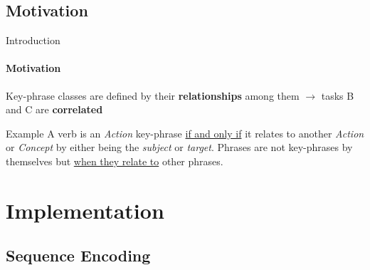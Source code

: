 \documentclass{beamer}
\begin{document}
\subsection{Motivation}
\begin{frame}{Introduction}
	\framesubtitle{Motivation}
	
	Key-phrase classes are defined by their \textbf{relationships} among them $\rightarrow$ tasks B and C are \textbf{correlated}
	
	\hspace{2em}
	
	\begin{block}{Example}
	A verb is an \emph{Action} key-phrase \underline{if and only if} it relates to another \emph{Action} or \emph{Concept} by either being the \emph{subject} or \emph{target}. Phrases are not key-phrases by themselves but \underline{when they relate to} other phrases.
\end{block}

\end{frame}



%
%

\section{Implementation}

\subsection{Sequence Encoding}
\end{document}

